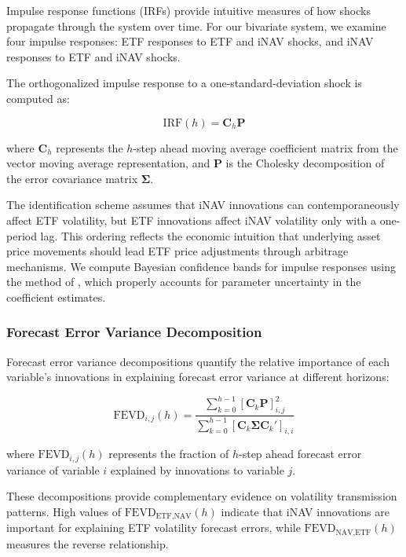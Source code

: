 Impulse response functions (IRFs) provide intuitive measures of how shocks propagate through the system over time. For our bivariate system, we examine four impulse responses: ETF responses to ETF and iNAV shocks, and iNAV responses to ETF and iNAV shocks.

The orthogonalized impulse response to a one-standard-deviation shock is computed as:

\begin{equation} \label{eq:impulse_response}
\text{IRF}(h) = \mathbf{C}_h \mathbf{P}
\end{equation}

where $\mathbf{C}_h$ represents the $h$-step ahead moving average coefficient matrix from the vector moving average representation, and $\mathbf{P}$ is the Cholesky decomposition of the error covariance matrix $\mathbf{\Sigma}$.

The identification scheme assumes that iNAV innovations can contemporaneously affect ETF volatility, but ETF innovations affect iNAV volatility only with a one-period lag. This ordering reflects the economic intuition that underlying asset price movements should lead ETF price adjustments through arbitrage mechanisms. We compute Bayesian confidence bands for impulse responses using the method of \citet{sims1999error}, which properly accounts for parameter uncertainty in the coefficient estimates.

\subsubsection{Forecast Error Variance Decomposition}

Forecast error variance decompositions quantify the relative importance of each variable's innovations in explaining forecast error variance at different horizons:

\begin{equation} \label{eq:fevd}
\text{FEVD}_{i,j}(h) = \frac{\sum_{k=0}^{h-1} [\mathbf{C}_k \mathbf{P}]_{i,j}^2}{\sum_{k=0}^{h-1} [\mathbf{C}_k \mathbf{\Sigma} \mathbf{C}_k']_{i,i}}
\end{equation}

where $\text{FEVD}_{i,j}(h)$ represents the fraction of $h$-step ahead forecast error variance of variable $i$ explained by innovations to variable $j$.

These decompositions provide complementary evidence on volatility transmission patterns. High values of $\text{FEVD}_{\text{ETF},\text{NAV}}(h)$ indicate that iNAV innovations are important for explaining ETF volatility forecast errors, while $\text{FEVD}_{\text{NAV},\text{ETF}}(h)$ measures the reverse relationship.

